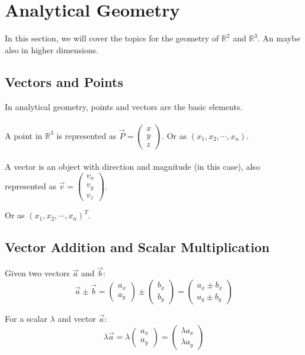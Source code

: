 \section{Analytical Geometry}

In this section, we will cover the topics for the geometry of \(\mathbb{R}^2\) and \(\mathbb{R}^3\).
An maybe also in higher dimensions.

\subsection{Vectors and Points}
In analytical geometry, points and vectors are the basic elements.
\\\\
A point in \(\mathbb{R}^3\) is represented as \(\vec{P} = \begin{pmatrix} x \\ y \\ z \end{pmatrix}\).
Or as \((x_1, x_2, \cdots , x_n)\).
\\\\
A vector is an object with direction and magnitude (in this case), also represented as \(\vec{v} = \begin{pmatrix} v_x \\ v_y \\ v_z \end{pmatrix}\).

Or as \((x_1, x_2, \cdots , x_n)^{T}\).

\subsection{Vector Addition and Scalar Multiplication}
Given two vectors \(\vec{a}\) and \(\vec{b}\):
\[
	\vec{a} \pm  \vec{b} = \begin{pmatrix} a_x \\ a_y \end{pmatrix} \pm \begin{pmatrix} b_x \\ b_y \end{pmatrix} = \begin{pmatrix} a_x \pm b_x \\ a_y \pm b_y \end{pmatrix}
\]

For a scalar \(\lambda\) and vector \(\vec{a}\):
\[
	\lambda \vec{a} = \lambda \begin{pmatrix} a_x \\ a_y \end{pmatrix} = \begin{pmatrix} \lambda a_x \\ \lambda a_y \end{pmatrix}
\]

